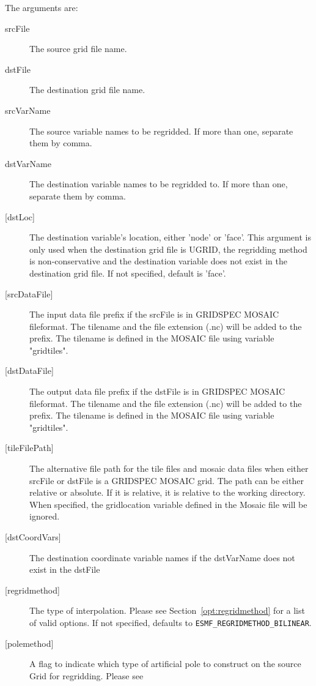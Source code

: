    The arguments are:
     \begin{description}
     \item [srcFile]
       The source grid file name.
     \item [dstFile]
       The destination grid file name.
     \item [srcVarName]
       The source variable names to be regridded. If more than one, separate them by comma.
     \item [dstVarName]
       The destination variable names to be regridded to. If more than one, separate them by comma.
     \item [{[dstLoc]}]
       The destination variable's location, either 'node' or 'face'.  This
       argument is only used when the destination grid file is UGRID, the regridding method is
       non-conservative and the destination variable does not exist in the destination grid file.
       If not specified, default is 'face'.
     \item [{[srcDataFile]}]
       The input data file prefix if the srcFile is in GRIDSPEC MOSAIC
       fileformat.  The tilename and the file extension (.nc) will be added to
       the prefix.  The tilename is defined in the MOSAIC file using variable "gridtiles".
     \item [{[dstDataFile]}]
       The output data file prefix if the dstFile is in GRIDSPEC MOSAIC
       fileformat.  The tilename and the file extension (.nc) will be added to
       the prefix.  The tilename is defined in the MOSAIC file using variable "gridtiles".
     \item [{[tileFilePath]}]
       The alternative file path for the tile files and mosaic data files when either srcFile or
       dstFile is a GRIDSPEC MOSAIC grid.  The path can be either relative or absolute.  If it is
       relative, it is relative to the working directory.  When specified, the gridlocation variable
       defined in the Mosaic file will be ignored.
     \item [{[dstCoordVars]}]
       The destination coordinate variable names if the dstVarName does not exist in the dstFile
     \item [{[regridmethod]}]
       The type of interpolation. Please see Section~\ref{opt:regridmethod}
       for a list of valid options. If not specified, defaults to
       {\tt ESMF\_REGRIDMETHOD\_BILINEAR}.
     \item [{[polemethod]}]
       A flag to indicate which type of artificial pole
       to construct on the source Grid for regridding. Please see

\end{description}

